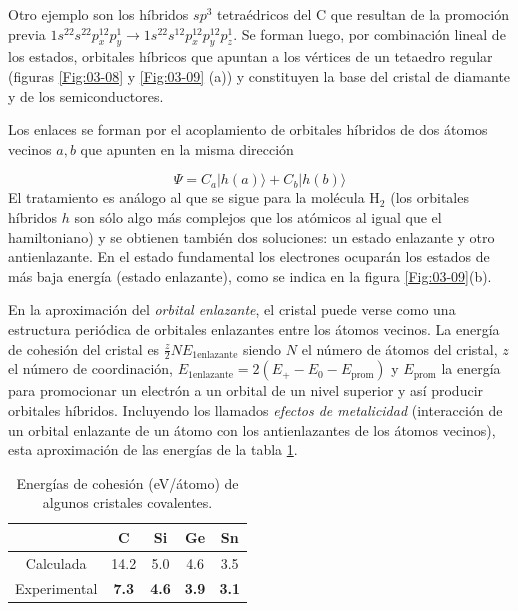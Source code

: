 Otro ejemplo son los híbridos $sp^3$ tetraédricos del C que resultan de la promoción previa $1s^22s^22p_x^12p_y^1 \rightarrow 1s^22s^12p_x^12p_y^12p_z^1$. Se forman luego, por combinación lineal de los estados, orbitales híbricos que apuntan a los vértices de un tetaedro regular (figuras \ref{Fig:03-08} y \ref{Fig:03-09} (a)) y constituyen la base del cristal de diamante y de los semiconductores. 

Los enlaces se forman por el acoplamiento de orbitales híbridos de dos átomos vecinos $a,b$ que apunten en la misma dirección 

\begin{equation}
    \Psi = C_a |h(a) \rangle + C_b |h(b) \rangle
\end{equation}
El tratamiento es análogo al que se sigue para la molécula H$_2$ (los orbitales híbridos $h$ son sólo algo más complejos que los atómicos al igual que el hamiltoniano) y se obtienen también dos soluciones: un estado enlazante y otro antienlazante. En el estado fundamental los electrones ocuparán los estados de más baja energía (estado enlazante), como se indica en la figura \ref{Fig:03-09}(b).

En la aproximación del \textit{orbital enlazante}, el cristal puede verse como una estructura periódica de orbitales enlazantes entre los átomos vecinos. La energía de cohesión del cristal es $\frac{z}{2} N E_{1\text{enlazante}}$ siendo $N$ el número de átomos del cristal, $z$ el número de coordinación, $E_{1\text{enlazante}} = 2 (E_+ - E_0  - E_{\text{prom}})$ y $E_{\text{prom}}$ la energía para promocionar un electrón a un orbital de un nivel superior y así producir orbitales híbridos. Incluyendo los llamados \textit{efectos de metalicidad} (interacción de un orbital enlazante de un átomo con los antienlazantes de los átomos vecinos), esta aproximación de las energías de la tabla \ref{Tab:03-04}.


\begin{table}[h!]  \centering
\begin{tabular}{c|cccc}
 & C & Si & Ge & Sn  \\ \hline
 Calculada & 14.2 & 5.0 & 4.6 & 3.5 \\
 Experimental & \textbf{7.3} & \textbf{4.6}&  \textbf{3.9} &  \textbf{3.1}
\end{tabular}
\caption{Energías de cohesión (eV/átomo) de algunos cristales covalentes.}
\label{Tab:03-04}
\end{table}

